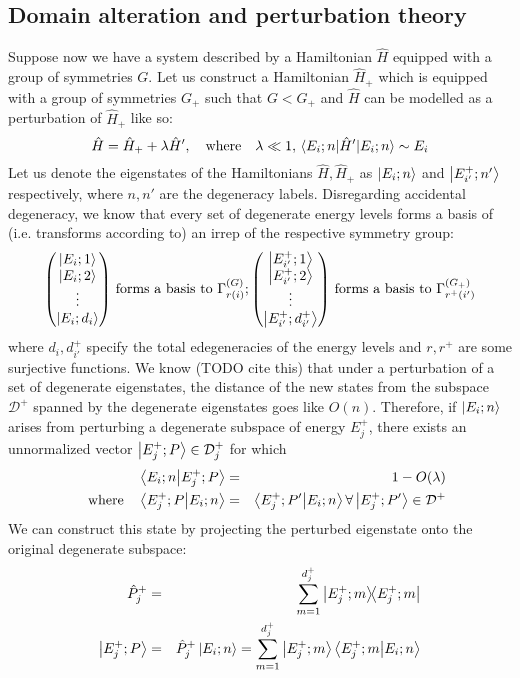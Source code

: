 \documentclass[12pt]{article}
\begin{document}
	\subsection{Domain alteration and perturbation theory}
	Suppose now we have a system described by a Hamiltonian $\hat{H}$ equipped with a group of symmetries $G$. Let us construct a Hamiltonian $\hat{H}_+$ which is equipped with a group of symmetries $G_+$ such that $G<G_+$ and $\hat{H}$ can be modelled as a perturbation of $\hat{H}_+$ like so:
	$$\hat{H}=\hat{H}_+ + \lambda \hat{H}',\qq{where}\lambda\ll 1, \mel{E_i;n}{\hat{H}'}{E_i;n}\sim E_i$$
	Let us denote the eigenstates of the Hamiltonians $\hat{H},\hat{H}_+$ as $\ket{E_i;n}$ and $\ket{E^+_{i'};n'}$ respectively, where $n, n'$ are the degeneracy labels. Disregarding accidental degeneracy, we know that every set of degenerate energy levels forms a basis of (i.e. transforms according to) an irrep of the respective symmetry group:
	$$\mqty(\ket{E_i;1}\\\ket{E_i;2}\\\vdots\\\ket{E_i;d_i})\mbox{ forms a basis to }\Gamma^{(G)}_{r(i)}; \mqty(\ket{E^+_{i'};1}\\\ket{E^+_{i'};2}\\\vdots\\\ket{E^+_{i'};d^+_{i'}})\mbox{ forms a basis to }\Gamma^{\left(G_+\right)}_{r^+(i')}$$
	where $d_i, d^+_{i'}$ specify the total edegeneracies of the energy levels and $r,r^+$ are some surjective functions.
	We know (TODO cite this) that under a perturbation of a set of degenerate eigenstates, the distance of the new states from the subspace $\mathcal{D}^+$ spanned by the degenerate eigenstates goes like $O(n)$. Therefore, if $\ket{E_i;n}$ arises from perturbing a degenerate subspace of energy $E^+_j$, there exists an unnormalized vector $\ket{E^+_j;P}\in\mathcal{D}^+_j$ for which
	\begin{eqnarray*}
	\braket{E_i;n}{E^+_j;P}&=&1-O(\lambda)\\
	\qq{where} \braket{E^+_j;P}{E_i;n}&=&\braket{E^+_j;P'}{E_i;n}\forall \ket{E^+_j;P'}\in\mathcal{D}^+
	\end{eqnarray*}
	We can construct this state by projecting the perturbed eigenstate onto the original degenerate subspace:
	\begin{eqnarray*}
	\hat{P}^+_j&=&\sum_{m=1}^{d^+_j}\dyad{E^+_j;m}{E^+_j;m}\\
	\ket{E^+_j;P}&=&\hat{P}^+_j\ket{E_i;n}=\sum_{m=1}^{d^+_j}\ket{E^+_j;m}\braket{E^+_j;m}{E_i;n}
	\end{eqnarray*}
\end{document}
